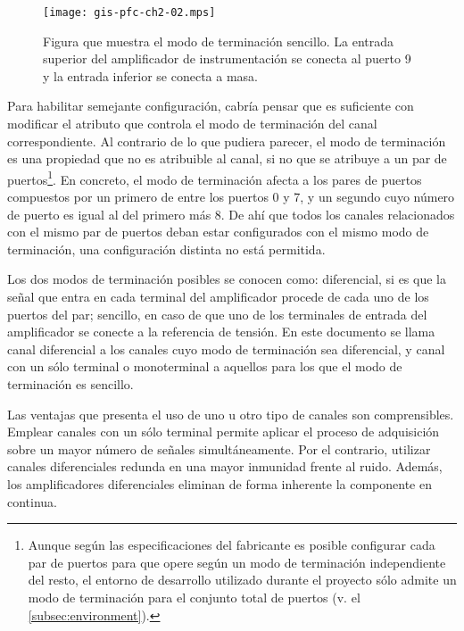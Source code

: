 \begin{figure}
	\begin{center}
		\texttt{[image: gis-pfc-ch2-02.mps]}
	\end{center}
	\caption[Ejemplo de configuración de terminación]{Figura que muestra el modo de terminación sencillo. La entrada superior del amplificador de instrumentación se conecta al puerto 9 y la entrada inferior se conecta a masa.}
	\label{fig:termmodes}
\end{figure}

Para habilitar semejante configuración, cabría pensar que es suficiente con modificar el atributo que controla el modo de terminación del canal correspondiente. Al contrario de lo que pudiera parecer, el modo de terminación es una propiedad que no es atribuible al canal, si no que se atribuye a un par de puertos\footnote{Aunque según las especificaciones del fabricante es posible configurar cada par de puertos para que opere según un modo de terminación independiente del resto, el entorno de desarrollo utilizado durante el proyecto sólo admite un modo de terminación para el conjunto total de puertos (v. el \vref{subsec:environment}).}. En concreto, el modo de terminación afecta a los pares de puertos compuestos por un primero de entre los puertos 0 y 7, y un segundo cuyo número de puerto es igual al del primero más 8. De ahí que todos los canales relacionados con el mismo par de puertos deban estar configurados con el mismo modo de terminación, una configuración distinta no está permitida.\par
Los dos modos de terminación posibles se conocen como: diferencial, si es que la señal que entra en cada terminal del amplificador procede de cada uno de los puertos del par; sencillo, en caso de que uno de los terminales de entrada del amplificador se conecte a la referencia de tensión. En este documento se llama canal diferencial a los canales cuyo modo de terminación sea diferencial, y canal con un sólo terminal o monoterminal a aquellos para los que el modo de terminación es sencillo. \par
Las ventajas que presenta el uso de uno u otro tipo de canales son comprensibles. Emplear canales con un sólo terminal permite aplicar el proceso de adquisición sobre un mayor número de señales simultáneamente. Por el contrario, utilizar canales diferenciales redunda en una mayor inmunidad frente al ruido. Además, los amplificadores diferenciales eliminan de forma inherente la componente en continua.\par


